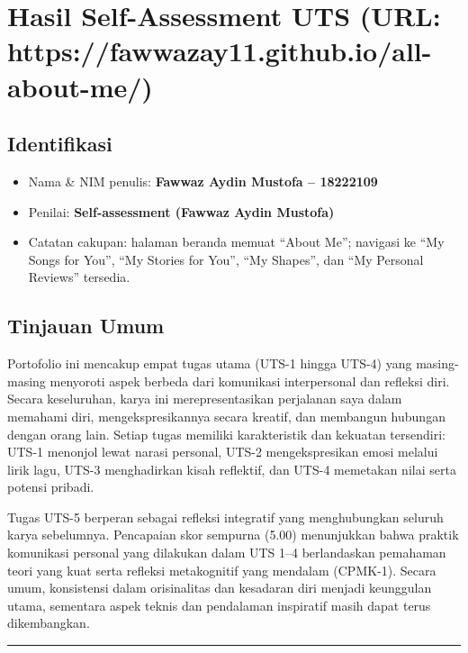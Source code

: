 \documentclass[
  letterpaper,
  DIV=11,
  numbers=noendperiod]{scrreprt}
\providecommand{\tightlist}{%
  \setlength{\itemsep}{0pt}\setlength{\parskip}{0pt}}
\begin{document}
\chapter{Hasil Self-Assessment UTS (URL:
https://fawwazay11.github.io/all-about-me/)}\label{hasil-self-assessment-uts-url-httpsfawwazay11.github.ioall-about-me}

\section{Identifikasi}\label{identifikasi}

\begin{itemize}
\tightlist
\item
  Nama \& NIM penulis: \textbf{Fawwaz Aydin Mustofa -- 18222109}
\item
  Penilai: \textbf{Self-assessment (Fawwaz Aydin Mustofa)}
\item
  Catatan cakupan: halaman beranda memuat ``About Me''; navigasi ke ``My
  Songs for You'', ``My Stories for You'', ``My Shapes'', dan ``My
  Personal Reviews'' tersedia.
\end{itemize}

\section{Tinjauan Umum}\label{tinjauan-umum}

Portofolio ini mencakup empat tugas utama (UTS-1 hingga UTS-4) yang
masing-masing menyoroti aspek berbeda dari komunikasi interpersonal dan
refleksi diri. Secara keseluruhan, karya ini merepresentasikan
perjalanan saya dalam memahami diri, mengekspresikannya secara kreatif,
dan membangun hubungan dengan orang lain. Setiap tugas memiliki
karakteristik dan kekuatan tersendiri: UTS-1 menonjol lewat narasi
personal, UTS-2 mengekspresikan emosi melalui lirik lagu, UTS-3
menghadirkan kisah reflektif, dan UTS-4 memetakan nilai serta potensi
pribadi.

Tugas UTS-5 berperan sebagai refleksi integratif yang menghubungkan
seluruh karya sebelumnya. Pencapaian skor sempurna (5.00) menunjukkan
bahwa praktik komunikasi personal yang dilakukan dalam UTS 1--4
berlandaskan pemahaman teori yang kuat serta refleksi metakognitif yang
mendalam (CPMK-1). Secara umum, konsistensi dalam orisinalitas dan
kesadaran diri menjadi keunggulan utama, sementara aspek teknis dan
pendalaman inspiratif masih dapat terus dikembangkan.

\begin{center}\rule{0.5\linewidth}{0.5pt}\end{center}
\end{document}
